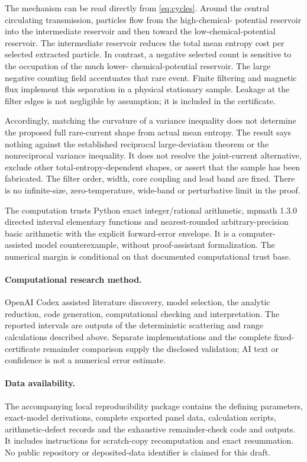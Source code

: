 \documentclass[11pt,a4paper]{article}
\begin{document}
The mechanism can be read directly from \eqref{eq:cycles}. Around the
central circulating transmission, particles flow from the high-chemical-
potential reservoir into the intermediate reservoir and then toward the
low-chemical-potential reservoir. The intermediate reservoir reduces the
total mean entropy cost per selected extracted particle. In contrast, a
negative selected count is sensitive to the occupation of the much lower-
chemical-potential reservoir. The large negative counting field accentuates
that rare event. Finite filtering and magnetic flux implement this
separation in a physical stationary sample. Leakage at the filter edges is
not negligible by assumption; it is included in the certificate.

Accordingly, matching the curvature of a variance inequality does not
determine the proposed full rare-current shape from actual mean entropy.
The result says nothing against the established reciprocal large-deviation
theorem or the nonreciprocal variance inequality. It does not resolve the
joint-current alternative, exclude other total-entropy-dependent shapes,
or assert that the sample has been fabricated. The filter order, width,
core coupling and lead band are fixed. There is no infinite-size,
zero-temperature, wide-band or perturbative limit in the proof.

The computation trusts Python exact integer/rational arithmetic,
mpmath 1.3.0 directed interval elementary functions and nearest-rounded
arbitrary-precision basic arithmetic with the explicit forward-error
envelope. It is a computer-assisted model counterexample, without
proof-assistant formalization. The numerical margin is conditional on that
documented computational trust base.

\paragraph{Computational research method.}
OpenAI Codex assisted literature discovery, model selection, the analytic
reduction, code generation, computational checking and interpretation.
The reported intervals are outputs of the deterministic scattering and
range calculations described above. Separate implementations and the
complete fixed-certificate remainder comparison supply the disclosed
validation; AI text or confidence is not a numerical error estimate.

\paragraph{Data availability.}
The accompanying local reproducibility package contains the defining
parameters, exact-model derivations, complete exported panel data,
calculation scripts, arithmetic-defect records and the exhaustive
remainder-check code and outputs. It includes instructions for scratch-copy
recomputation and exact resummation. No public repository or deposited-data
identifier is claimed for this draft.
\end{document}
